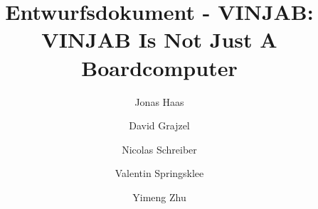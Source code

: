 \documentclass[a4paper]{scrreprt}
\begin{document}
\title{Entwurfsdokument - VINJAB: VINJAB Is Not Just A Boardcomputer}
\author{Jonas Haas 
			\and David Grajzel 
			\and Nicolas Schreiber
			\and Valentin Springsklee
			\and Yimeng Zhu}


\maketitle

\newpage
\setcounter{page}{1} %


\tableofcontents

\newpage
{}










\end{document}
